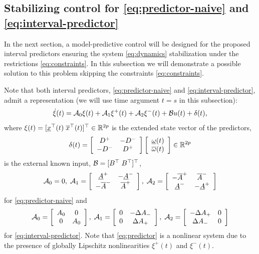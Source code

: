 \documentclass[letterpaper, 10 pt, conference]{ieeeconf}  %
\begin{document}
\subsection{Stabilizing control for \eqref{eq:predictor-naive} and \eqref{eq:interval-predictor}}

In the next section, a model-predictive control will be designed for
the proposed interval predictors ensuring the system \eqref{eq:dynamics}
stabilization under the restrictions \eqref{eq:constraints}. In this
subsection we will demonstrate a possible solution to this problem
skipping the constraints \eqref{eq:constraints}.

Note that both interval predictors, \eqref{eq:predictor-naive} and
\eqref{eq:interval-predictor}, admit a representation (we will use
time argument $t=s$ in this subsection):
\begin{equation}
\dot{\xi}(t)=\mathcal{A}_{0}\xi(t)+\mathcal{A}_{1}\xi^{+}(t)+\mathcal{A}_{2}\xi^{-}(t)+\mathcal{B} u(t)+\delta(t),\label{eq:predictor}
\end{equation}
where $\xi(t)=[\underline{x}^{\top}(t)\;\overline{x}^{\top}(t)]^{\top}\in\mathbb{R}^{2p}$
is the extended state vector of the predictors,
\[
\delta(t)=\left[\begin{array}{cc}
D^{+} & -D^{-}\\
-D^{-} & D^{+}
\end{array}\right]\left[\begin{array}{c}
\underline{\omega}(t)\\
\overline{\omega}(t)
\end{array}\right]\in\mathbb{R}^{2p}
\]
is the external known input, $\mathcal{B}=[B^{\top}\;B^{\top}]^{\top}$, 
\[
\mathcal{A}_{0}=0,\;\mathcal{A}_{1}=\left[\begin{array}{cc}
\underline{A}^{+} & -\underline{A}^{-}\\
-\overline{A}^{-} & \overline{A}^{+}
\end{array}\right],\;\mathcal{A}_{2}=\left[\begin{array}{cc}
-\overline{A}^{+} & \overline{A}^{-}\\
\underline{A}^{-} & -\underline{A}^{+}
\end{array}\right]
\]
for \eqref{eq:predictor-naive} and
\[
\mathcal{A}_{0}=\left[\begin{array}{cc}
A_{0} & 0\\
0 & A_{0}
\end{array}\right],\;\mathcal{A}_{1}=\left[\begin{array}{cc}
0 & -\Delta A_{-}\\
0 & \Delta A_{+}
\end{array}\right],\;\mathcal{A}_{2}=\left[\begin{array}{cc}
-\Delta A_{+} & 0\\
\Delta A_{-} & 0
\end{array}\right]
\]
for \eqref{eq:interval-predictor}. Note that \eqref{eq:predictor}
is a nonlinear system due to the presence of globally Lipschitz nonlinearities
$\xi^{+}(t)$ and $\xi^{-}(t)$. 
\end{document}
